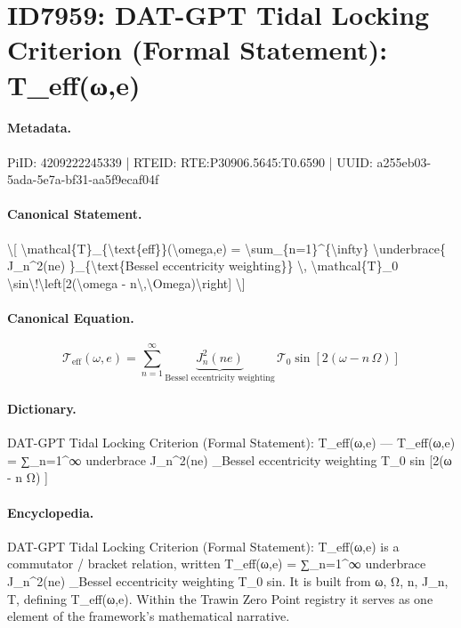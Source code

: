 \section*{ID7959: DAT-GPT Tidal Locking Criterion (Formal Statement): T\_eff(ω,e)}
\paragraph{Metadata.}
PiID: 4209222245339 | RTEID: RTE:P30906.5645:T0.6590 | UUID: a255eb03-5ada-5e7a-bf31-aa5f9ecaf04f

\paragraph{Canonical Statement.}
\textbackslash{}[ \textbackslash{}mathcal\{T\}\_\{\textbackslash{}text\{eff\}\}(\textbackslash{}omega,e) = \textbackslash{}sum\_\{n=1\}\textasciicircum{}\{\textbackslash{}infty\} \textbackslash{}underbrace\{ J\_n\textasciicircum{}2(ne) \}\_\{\textbackslash{}text\{Bessel eccentricity weighting\}\} \textbackslash{}, \textbackslash{}mathcal\{T\}\_0 \textbackslash{}sin\textbackslash{}!\textbackslash{}left[2(\textbackslash{}omega - n\textbackslash{},\textbackslash{}Omega)\textbackslash{}right] \textbackslash{}]

\paragraph{Canonical Equation.}
\[
\mathcal{T}_{\text{eff}}(\omega,e) = \sum_{n=1}^{\infty} \underbrace{ J_n^2(ne) }_{\text{Bessel eccentricity weighting}} \, \mathcal{T}_0 \sin\!\left[2(\omega - n\,\Omega)\right]
\]

\paragraph{Dictionary.}
DAT-GPT Tidal Locking Criterion (Formal Statement): T\_eff(ω,e) — T\_eff(ω,e) = ∑\_n=1\textasciicircum{}∞ underbrace J\_n\textasciicircum{}2(ne) \_Bessel eccentricity weighting T\_0 sin [2(ω - n Ω) ]

\paragraph{Encyclopedia.}
DAT-GPT Tidal Locking Criterion (Formal Statement): T\_eff(ω,e) is a commutator / bracket relation, written T\_eff(ω,e) = ∑\_n=1\textasciicircum{}∞ underbrace J\_n\textasciicircum{}2(ne) \_Bessel eccentricity weighting T\_0 sin. It is built from ω, Ω, n, J\_n, T, defining T\_eff(ω,e). Within the Trawin Zero Point registry it serves as one element of the framework's mathematical narrative.
